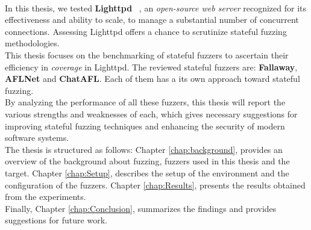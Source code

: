 \\In this thesis, we tested \textbf{Lighttpd} ~\cite{lighttpd}, an \textit{open-source web server} recognized for its effectiveness and ability to scale, to manage a substantial number of concurrent connections. Assessing Lighttpd offers a chance to scrutinize stateful fuzzing methodologies.
\\This thesis focuses on the benchmarking of stateful fuzzers to ascertain their efficiency in \textit{coverage} in Lighttpd. The reviewed stateful fuzzers are: \textbf{Fallaway}, \textbf{AFLNet} and \textbf{ChatAFL}. Each of them has a its own approach toward stateful fuzzing.
\\By analyzing the performance of all these fuzzers, this thesis will report the various strengths and weaknesses of each, which gives necessary suggestions for improving stateful fuzzing techniques and enhancing the security of modern software systems.
\\The thesis is structured as follows: Chapter \ref{chap:background}, provides an overview of the background about fuzzing, fuzzers used in this thesis and the target. Chapter \ref{chap:Setup}, describes the setup of the environment and the configuration of the fuzzers. Chapter \ref{chap:Results}, presents the results obtained from the experiments.
\\Finally, Chapter \ref{chap:Conclusion}, summarizes the findings and provides suggestions for future work.